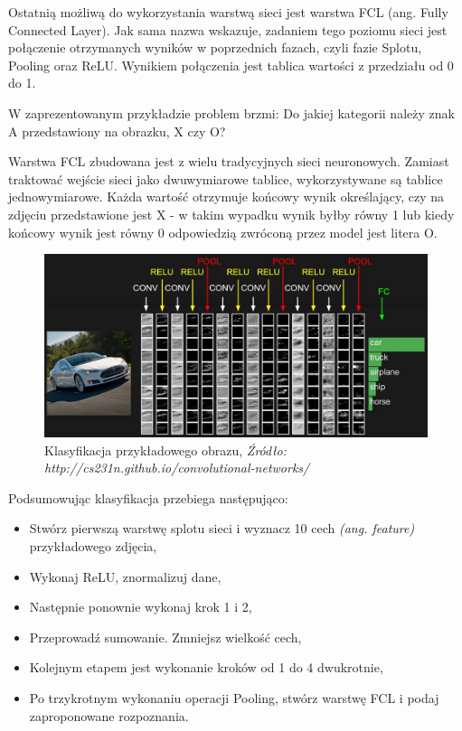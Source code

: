 \documentclass[brudnopis]{xmgr}
\begin{document}
Ostatnią możliwą do wykorzystania warstwą sieci jest warstwa FCL (ang. Fully Connected Layer). Jak sama nazwa wskazuje, zadaniem tego poziomu sieci jest połączenie otrzymanych wyników w poprzednich fazach, czyli fazie Splotu, Pooling oraz ReLU. Wynikiem połączenia jest tablica wartości z przedziału od 0 do 1. 
\newpage

W zaprezentowanym przykładzie problem brzmi: Do jakiej kategorii należy znak A przedstawiony na obrazku, X czy O?

Warstwa FCL zbudowana jest z wielu tradycyjnych sieci neuronowych. Zamiast traktować wejście sieci jako dwuwymiarowe tablice, wykorzystywane są tablice jednowymiarowe. Każda wartość otrzymuje końcowy wynik określający, czy na zdjęciu przedstawione jest X - w takim wypadku wynik byłby równy 1 lub kiedy końcowy wynik jest równy 0 odpowiedzią zwróconą przez model jest litera O.

\begin{figure}[!tbh]
\centering
\includegraphics[width=.8\hsize]{fig/convnet}
\caption{Klasyfikacja przykładowego obrazu, \emph{Źródło: http://cs231n.github.io/convolutional-networks/}}
\end{figure}

Podsumowując klasyfikacja przebiega następująco:
\begin{itemize}
\item
Stwórz pierwszą warstwę splotu sieci i wyznacz 10 cech \emph{(ang. feature)} przykładowego zdjęcia,
\item
Wykonaj ReLU, znormalizuj dane,
\item
Następnie ponownie wykonaj krok 1 i 2,
\item
Przeprowadź sumowanie. Zmniejsz wielkość cech,
\item
Kolejnym etapem jest wykonanie kroków od 1 do 4 dwukrotnie,
\item
Po trzykrotnym wykonaniu operacji Pooling, stwórz warstwę FCL i podaj zaproponowane rozpoznania.
\end{itemize}
\end{document}

